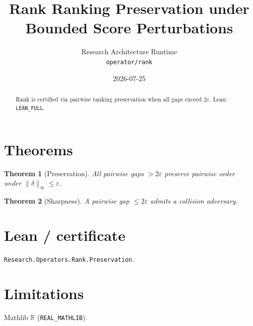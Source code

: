 \documentclass[11pt]{article}
\title{Rank Ranking Preservation under Bounded Score Perturbations}
\author{Research Architecture Runtime \\ \texttt{operator/rank}}
\date{2026-07-25}
\newtheorem{theorem}{Theorem}
\begin{document}
\maketitle
\begin{abstract}
Rank is certified via pairwise ranking preservation when all gaps exceed $2\varepsilon$. Lean: \texttt{LEAN\_FULL}.
\end{abstract}
\section{Theorems}
\begin{theorem}[Preservation]
All pairwise gaps $>2\varepsilon$ preserve pairwise order under $\|\delta\|_\infty\le\varepsilon$.
\end{theorem}
\begin{theorem}[Sharpness]
A pairwise gap $\le 2\varepsilon$ admits a collision adversary.
\end{theorem}
\section{Lean / certificate}
\texttt{Research.Operators.Rank.Preservation}.
\section{Limitations}
Mathlib $\mathbb{R}$ (\texttt{REAL\_MATHLIB}).
\end{document}

